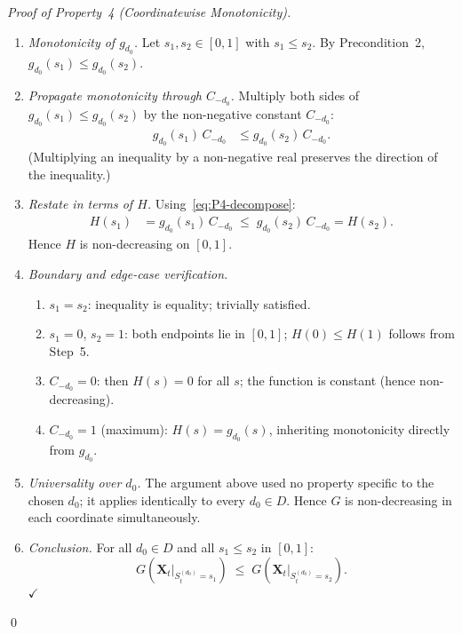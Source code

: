 \documentclass[12pt,openany]{book}
\numberwithin{equation}{chapter}
\theoremstyle{plain}
\theoremstyle{definition}
\theoremstyle{remark}
\def\mathcal#1{#1}%
\begin{document}
\begin{proof}[Proof of Property~4 (Coordinatewise Monotonicity)]
\begin{enumerate}
  \item \emph{Monotonicity of $g_{d_0}$.}
        Let $s_1,s_2\in[0,1]$ with $s_1\leq s_2$.
        By Precondition~2, $g_{d_0}(s_1)\leq g_{d_0}(s_2)$.

  \item \emph{Propagate monotonicity through $C_{-d_0}$.}
        Multiply both sides of $g_{d_0}(s_1)\leq g_{d_0}(s_2)$
        by the non-negative constant $C_{-d_0}$:
        \begin{align}
          g_{d_0}(s_1)\,C_{-d_0}
          &\leq g_{d_0}(s_2)\,C_{-d_0}.
          \label{eq:P4-mono-step}
        \end{align}
        (Multiplying an inequality by a non-negative real
        preserves the direction of the inequality.)

  \item \emph{Restate in terms of $H$.}
        Using~\eqref{eq:P4-decompose}:
        \begin{align}
          H(s_1)
          &= g_{d_0}(s_1)\,C_{-d_0}
           \;\leq\;
           g_{d_0}(s_2)\,C_{-d_0}
           = H(s_2).
          \label{eq:P4-H-mono}
        \end{align}
        Hence $H$ is non-decreasing on $[0,1]$.

  \item \emph{Boundary and edge-case verification.}
        \begin{enumerate}
          \item $s_1=s_2$: inequality is equality; trivially satisfied.
          \item $s_1=0$, $s_2=1$: both endpoints lie in $[0,1]$;
                $H(0)\leq H(1)$ follows from Step~5.
          \item $C_{-d_0}=0$: then $H(s)=0$ for all $s$; the
                function is constant (hence non-decreasing).
          \item $C_{-d_0}=1$ (maximum): $H(s)=g_{d_0}(s)$,
                inheriting monotonicity directly from $g_{d_0}$.
        \end{enumerate}

  \item \emph{Universality over $d_0$.}
        The argument above used no property specific to the
        chosen $d_0$; it applies identically to every
        $d_0\in\mathcal{D}$.  Hence $G$ is non-decreasing
        in each coordinate simultaneously.

  \item \emph{Conclusion.}
        For all $d_0\in\mathcal{D}$ and all
        $s_1\leq s_2$ in $[0,1]$:
        \begin{equation}
          G\!\left(\mathbf{X}_t\big|_{\mathcal{S}_t^{(d_0)}=s_1}\right)
          \;\leq\;
          G\!\left(\mathbf{X}_t\big|_{\mathcal{S}_t^{(d_0)}=s_2}\right).
          \label{eq:P4-conclusion}
        \end{equation}
        \hfill$\checkmark$
\end{enumerate}
\qed
\end{proof}
\end{document}
